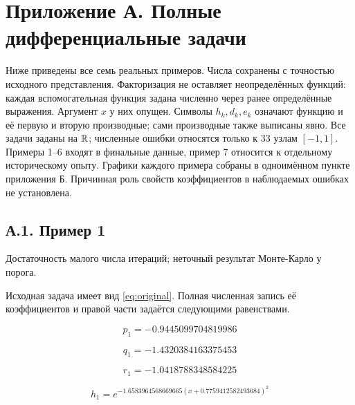 \renewcommand{\theHequation}{A.\arabic{equation}}\renewcommand{\theHtable}{A.\arabic{table}}

\section*{Приложение А. Полные дифференциальные задачи}\label{app:a}

\renewcommand{\theequation}{А.\arabic{equation}}\setcounter{equation}{0}

\renewcommand{\thetable}{А.\arabic{table}}\setcounter{table}{0}

\small\setlength{\abovedisplayskip}{3pt}\setlength{\belowdisplayskip}{3pt}\setlength{\belowdisplayshortskip}{3pt}

Ниже приведены все семь реальных примеров. Числа сохранены с точностью исходного представления. Факторизация не оставляет неопределённых функций: каждая вспомогательная функция задана численно через ранее определённые выражения. Аргумент $x$ у них опущен. Символы $h_k,d_k,e_k$ означают функцию и её первую и вторую производные; сами производные также выписаны явно. Все задачи заданы на $\mathbb R$; численные ошибки относятся только к 33 узлам $[-1,1]$. Примеры 1--6 входят в финальные данные, пример 7 относится к отдельному историческому опыту. Графики каждого примера собраны в одноимённом пункте приложения Б. Причинная роль свойств коэффициентов в наблюдаемых ошибках не установлена.

\subsection*{А.1. Пример 1}\label{app:ex1}

Достаточность малого числа итераций; неточный результат Монте-Карло у порога.

Исходная задача имеет вид \eqref{eq:original}. Полная численная запись её коэффициентов и правой части задаётся следующими равенствами.

\begin{equation}
p_{1}=-0.9445099704819986
\end{equation}


\begin{equation}
q_{1}=-1.4320384163375453
\end{equation}


\begin{equation}
r_{1}=-1.0418788348584225
\end{equation}


\begin{equation}
h_{1}=e^{- 1.6583964568669665 \left(x + 0.7759412582493684\right)^{2}}
\end{equation}


